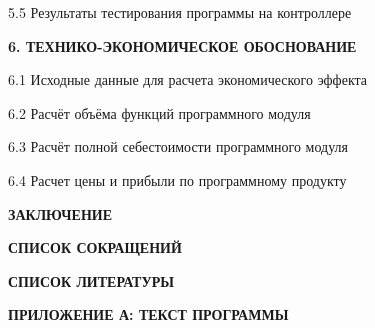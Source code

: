 {    \par 5.5 Результаты тестирования программы на контроллере 
    \par {\bfseries 6. ТЕХНИКО-ЭКОНОМИЧЕСКОЕ ОБОСНОВАНИЕ }
    \par 6.1 Исходные данные для расчета экономического эффекта 
    \par 6.2 Расчёт объёма функций программного модуля 
    \par 6.3 Расчёт полной себестоимости программного модуля 
    \par 6.4 Расчет цены и прибыли по программному продукту 
    \par {\bfseries ЗАКЛЮЧЕНИЕ } 
    \par {\bfseries СПИСОК СОКРАЩЕНИЙ } 
    \par {\bfseries СПИСОК ЛИТЕРАТУРЫ } 
    \par {\bfseries ПРИЛОЖЕНИЕ А: ТЕКСТ ПРОГРАММЫ} 
    \par 
}